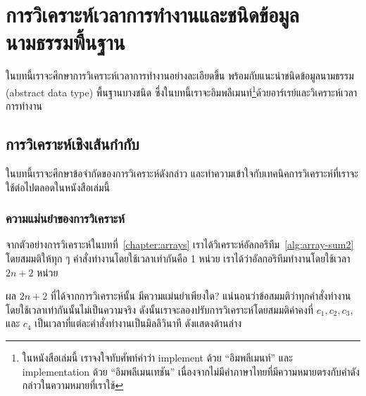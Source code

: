 \chapter{การ{\wbr}วิเคราะห์{\wbr}เวลา{\wbr}การ{\wbr}ทำงาน{\wbr}และ{\wbr}ชนิด{\wbr}ข้อมูล{\wbr}นามธรรม{\wbr}พื้นฐาน}
\label{chapter:analysis}

ใน{\wbr}บท{\wbr}นี้{\wbr}เรา{\wbr}จะ{\wbr}ศึกษา{\wbr}การ{\wbr}วิเคราะห์{\wbr}เวลา{\wbr}การ{\wbr}ทำงาน{\wbr}อย่าง{\wbr}ละเอียด{\wbr}ขึ้น{\wbr}
พร้อมกับ{\wbr}แนะนำ{\wbr}ชนิด{\wbr}ข้อมูล{\wbr}นามธรรม (abstract data type) พื้นฐาน{\wbr}บาง{\wbr}ชนิด{\wbr}
ซึ่ง{\wbr}ใน{\wbr}บท{\wbr}นี้{\wbr}เรา{\wbr}จะ{\wbr}อิม{\wbr}พลี{\wbr}เมนท์\footnote{ใน{\wbr}หนังสือ{\wbr}เล่ม{\wbr}นี้ เรา{\wbr}จงใจ{\wbr}ทับศัพท์{\wbr}คำ{\wbr}ว่า implement
  ด้วย ``อิม{\wbr}พลี{\wbr}เมนท์'' และ implementation ด้วย ``อิมพลี{\wbr}เมน{\wbr}เท{\wbr}ชัน''
  เนื่องจาก{\wbr}ไม่{\wbr}มี{\wbr}คำ{\wbr}ภาษาไทย{\wbr}ที่{\wbr}มี{\wbr}ความหมาย{\wbr}ตรง{\wbr}กับ{\wbr}คำ{\wbr}ดังกล่าว{\wbr}ใน{\wbr}ความหมาย{\wbr}ที่{\wbr}เรา{\wbr}ใช้}ด้วย{\wbr}อาร์เรย์{\wbr}และ{\wbr}วิเคราะห์{\wbr}เวลา{\wbr}การ{\wbr}ทำงาน{\wbr}

\section{การ{\wbr}วิเคราะห์{\wbr}เชิง{\wbr}เส้น{\wbr}กำกับ}
ใน{\wbr}บท{\wbr}นี้{\wbr}เรา{\wbr}จะ{\wbr}ศึกษา{\wbr}ข้อจำกัด{\wbr}ของ{\wbr}การ{\wbr}วิเคราะห์{\wbr}ดังกล่าว{\wbr}
และ{\wbr}ทำ{\wbr}ความ{\wbr}เข้าใจ{\wbr}กับ{\wbr}เทคนิค{\wbr}การ{\wbr}วิเคราะห์{\wbr}ที่{\wbr}เรา{\wbr}จะ{\wbr}ใช้{\wbr}ต่อไป{\wbr}ตลอด{\wbr}ใน{\wbr}หนังสือ{\wbr}เล่ม{\wbr}นี้{\wbr}

\subsection{ความ{\wbr}แม่นยำ{\wbr}ของ{\wbr}การ{\wbr}วิเคราะห์}
จาก{\wbr}ตัวอย่าง{\wbr}การ{\wbr}วิเคราะห์{\wbr}ใน{\wbr}บท{\wbr}ที่~\ref{chapter:arrays}
เรา{\wbr}ได้{\wbr}วิเคราะห์{\wbr}อัล{\wbr}กอ{\wbr}ริ{\wbr}ทึม~\ref{alg:array-sum2} โดย{\wbr}สมมติ{\wbr}ให้{\wbr}ทุก ๆ
คำสั่ง{\wbr}ทำงาน{\wbr}โดย{\wbr}ใช้เวลา{\wbr}เท่า{\wbr}กัน{\wbr}คือ 1 หน่วย เรา{\wbr}ได้{\wbr}ว่า{\wbr}อัล{\wbr}กอ{\wbr}ริ{\wbr}ทึม{\wbr}ทำงาน{\wbr}โดย{\wbr}ใช้เวลา $2n+2$
หน่วย{\wbr}

ผล $2n+2$ ที่{\wbr}ได้{\wbr}จาก{\wbr}การ{\wbr}วิเคราะห์{\wbr}นั้น มี{\wbr}ความ{\wbr}แม่นยำ{\wbr}เพียงใด?
แน่นอน{\wbr}ว่า{\wbr}ข้อสมมติ{\wbr}ว่า{\wbr}ทุก{\wbr}คำสั่ง{\wbr}ทำงาน{\wbr}โดย{\wbr}ใช้เวลา{\wbr}เท่า{\wbr}กัน{\wbr}นั้น{\wbr}ไม่{\wbr}เป็น{\wbr}ความจริง{\wbr}
ดังนั้น{\wbr}เรา{\wbr}จะ{\wbr}ลอง{\wbr}ปรับ{\wbr}การ{\wbr}วิเคราะห์{\wbr}โดย{\wbr}สมมติ{\wbr}ค่าคงที่ $c_1,c_2,c_3,$ และ $c_4$
เป็น{\wbr}เวลา{\wbr}ที่{\wbr}แต่ละ{\wbr}คำสั่ง{\wbr}ทำงาน{\wbr}เป็น{\wbr}มิ{\wbr}ลลิ{\wbr}วินาที  ดัง{\wbr}แสดง{\wbr}ด้าน{\wbr}ล่าง{\wbr}

